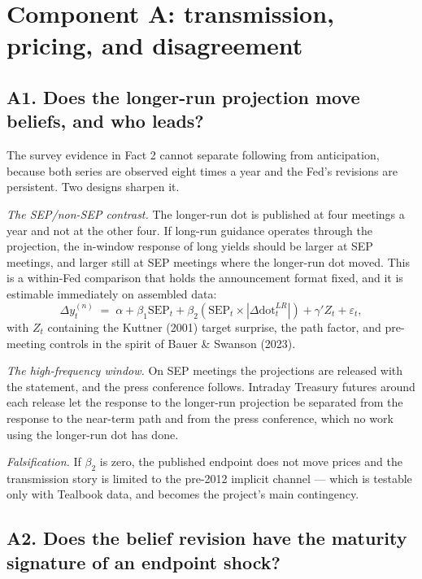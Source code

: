 \documentclass[11pt]{article}
\begin{document}
\section{Component A: transmission, pricing, and disagreement}

\subsection{A1. Does the longer-run projection move beliefs, and who leads?}

The survey evidence in Fact 2 cannot separate following from anticipation, because both series
are observed eight times a year and the Fed's revisions are persistent. Two designs sharpen it.

\emph{The SEP/non-SEP contrast.} The longer-run dot is published at four meetings a year and
not at the other four. If long-run guidance operates through the projection, the in-window
response of long yields should be larger at SEP meetings, and larger still at SEP meetings
where the longer-run dot moved. This is a within-Fed comparison that holds the announcement
format fixed, and it is estimable immediately on assembled data:
\begin{equation}
\Delta y^{(n)}_t \;=\; \alpha + \beta_1 \text{SEP}_t + \beta_2 \left(\text{SEP}_t \times |\Delta \text{dot}^{LR}_t|\right) + \gamma' Z_t + \varepsilon_t ,
\label{eq:sep}
\end{equation}
with $Z_t$ containing the Kuttner (2001) target surprise, the path factor, and pre-meeting
controls in the spirit of Bauer \& Swanson (2023).

\emph{The high-frequency window.} On SEP meetings the projections are released with the
statement, and the press conference follows. Intraday Treasury futures around each release let
the response to the longer-run projection be separated from the response to the near-term path
and from the press conference, which no work using the longer-run dot has done.

\emph{Falsification.} If $\beta_2$ is zero, the published endpoint does not move prices and
the transmission story is limited to the pre-2012 implicit channel --- which is testable only
with Tealbook data, and becomes the project's main contingency.

\subsection{A2. Does the belief revision have the maturity signature of an endpoint shock?}
\end{document}

